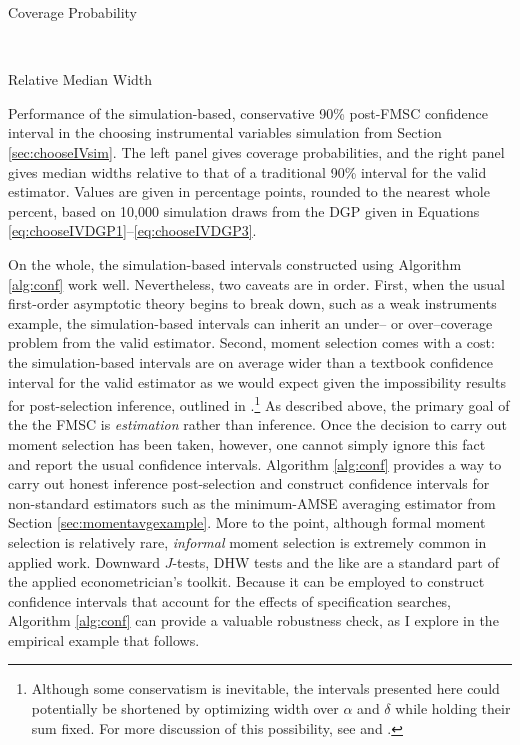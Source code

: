 \begin{table}[h]
\footnotesize
\centering
	\begin{subtable}{0.48\textwidth}
		\caption{Coverage Probability}
		\label{tab:chooseIVsim_cover_FMSC}
		
	\end{subtable}	
	~
	\begin{subtable}{0.48\textwidth}
		\caption{Relative Median Width}
		\label{tab:chooseIVsim_width_FMSC}
		
	\end{subtable}
\caption{Performance of the simulation-based, conservative 90\% post-FMSC confidence interval in the choosing instrumental variables simulation from Section \ref{sec:chooseIVsim}. The left panel gives coverage probabilities, and the right panel gives median widths relative to that of a traditional 90\% interval for the valid estimator. Values are given in percentage points, rounded to the nearest whole percent, based on 10,000 simulation draws from the DGP given in Equations \ref{eq:chooseIVDGP1}--\ref{eq:chooseIVDGP3}.}
\end{table}

On the whole, the simulation-based intervals constructed using Algorithm \ref{alg:conf} work well.
Nevertheless, two caveats are in order.
First, when the usual first-order asymptotic theory begins to break down, such as a weak instruments example, the simulation-based intervals can inherit an under-- or over--coverage problem from the valid estimator.
Second, moment selection comes with a cost: the simulation-based intervals are on average wider than a textbook confidence interval for the valid estimator as we would expect given the impossibility results for post-selection inference, outlined in \cite{LeebPoetscher2005}.\footnote{Although some conservatism is inevitable, the intervals presented here could potentially be shortened by optimizing width over $\alpha$ and $\delta$ while holding their sum fixed. For more discussion of this possibility, see \cite{ClaeskensHjortbook} and \cite{McCloskey}.}
As described above, the primary goal of the the FMSC is \emph{estimation} rather than inference.
Once the decision to carry out moment selection has been taken, however, one cannot simply ignore this fact and report the usual confidence intervals.
Algorithm \ref{alg:conf} provides a way to carry out honest inference post-selection and construct confidence intervals for non-standard estimators such as the minimum-AMSE averaging estimator from Section \ref{sec:momentavgexample}.
More to the point, although formal moment selection is relatively rare, \emph{informal} moment selection is extremely common in applied work.
Downward $J$-tests, DHW tests and the like are a standard part of the applied econometrician's toolkit.
Because it can be employed to construct confidence intervals that account for the effects of specification searches, Algorithm \ref{alg:conf} can provide a valuable robustness check, as I explore in the empirical example that follows.
